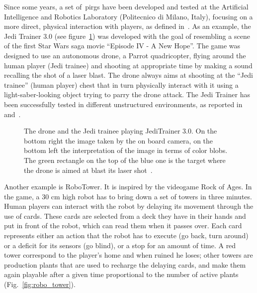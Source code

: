 Since some years, a set of~\gls{pirg}s have been developed and tested at the Artificial Intelligence and Robotics Laboratory (Politecnico di Milano, Italy), focusing on a more direct, physical interaction with players, as defined in~\cite{martinoia_physically_2013}. As an example, the Jedi Trainer 3.0 (see figure~\ref{fig:jedi_trainer}) was developed with the goal of resembling a scene of the first Star Wars saga movie ``Episode IV - A New Hope''. The game was designed to use an autonomous drone, a Parrot quadricopter, flying around the human player (Jedi trainee) and shooting at appropriate time by making a sound recalling the shot of a laser blast. The drone always aims at shooting at the ``Jedi trainee'' (human player) chest that in turn physically interact with it using a light-saber-looking object trying to parry the drone attack. The Jedi Trainer has been successfully tested in different unstructured environments, as reported in~\cite{bonarini_timing_2014} and~\cite{martinoia_physically_2013}.

\begin{figure}[h]
  \centering  
  \caption{The drone and the Jedi trainee playing JediTrainer 3.0. On the bottom right the image taken by the on board camera, on the bottom left the interpretation of the image in terms of color blobs. The green rectangle on the top of the blue one is the target where the drone is aimed at blast its laser shot~\citep{bonarini_timing_2014}.}
  \label{fig:jedi_trainer}
\end{figure}

Another example is RoboTower. It is inspired by the videogame Rock of Ages. In the game, a 30 cm high robot has to bring down a set of towers in three minutes. Human players can interact with the robot by delaying its movement through the use of cards. These cards are selected from a deck they have in their hands and put in front of the robot, which can read them when it passes over. Each card represents either an action that the robot has to execute (go back, turn around) or a deficit for its sensors (go blind), or a stop for an amount of time. A red tower correspond to the player's home and when ruined he loses; other towers are production plants that are used to recharge the delaying cards, and make them again playable after a given time proportional to the number of active plants (Fig.~\ref{fig:robo_tower}).

